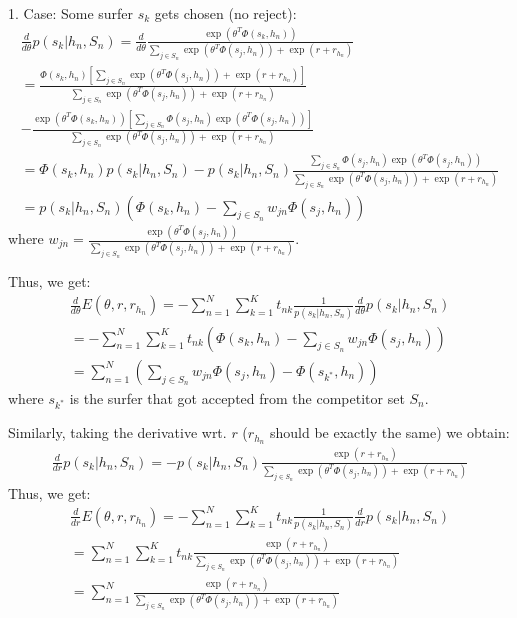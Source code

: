 1. Case: Some surfer $s_k$ gets chosen (no reject):
\begin{eqnarray}
\frac{d}{d \theta} p(s_k | h_n, S_n) = \frac{d}{d \theta} \frac{\exp(\theta^T \Phi(s_k,h_n))}{\sum_{j \in S_n} \exp(\theta^T \Phi(s_j,h_n)) + \exp(r + r_{h_n})} \\
= \frac{\Phi(s_k,h_n) [\sum_{j \in S_n} \exp(\theta^T \Phi(s_j,h_n)) + \exp(r + r_{h_n})]}{\sum_{j \in S_n} \exp(\theta^T \Phi(s_j,h_n)) + \exp(r + r_{h_n})} \\
- \frac{\exp(\theta^T \Phi(s_k,h_n)) [\sum_{j \in S_n} \Phi(s_j,h_n) \exp(\theta^T \Phi(s_j,h_n))]}{\sum_{j \in S_n} \exp(\theta^T \Phi(s_j,h_n)) + \exp(r + r_{h_n})}\\
= \Phi(s_k,h_n) p(s_k | h_n, S_n) - p(s_k | h_n, S_n) \frac{\sum_{j \in S_n} \Phi(s_j,h_n) \exp(\theta^T \Phi(s_j,h_n))}{\sum_{j \in S_n} \exp(\theta^T \Phi(s_j,h_n)) + \exp(r + r_{h_n})}\\
= p(s_k | h_n, S_n) (\Phi(s_k,h_n) - \sum_{j \in S_n} w_{jn} \Phi(s_j,h_n))
\end{eqnarray}
where $w_{jn}=\frac{\exp(\theta^T \Phi(s_j,h_n))}{\sum_{j \in S_n} \exp(\theta^T \Phi(s_j,h_n)) + \exp(r + r_{h_n})}$.

Thus, we get:
\begin{eqnarray}
\frac{d}{d \theta} E(\theta, r, r_{h_n}) = - \sum_{n=1}^N \sum_{k=1}^K t_{nk} \frac{1}{p(s_k | h_n, S_n)} \frac{d}{d \theta} p(s_k | h_n, S_n)\\
= - \sum_{n=1}^N \sum_{k=1}^K t_{nk} (\Phi(s_k,h_n) - \sum_{j \in S_n} w_{jn} \Phi(s_j,h_n)) \\
= \sum_{n=1}^N (\sum_{j \in S_n} w_{jn} \Phi(s_j,h_n) - \Phi(s_{k^*},h_n))
\end{eqnarray}
where $s_{k^*}$ is the surfer that got accepted from the competitor set $S_n$.

Similarly, taking the derivative wrt. $r$ ($r_{h_n}$ should be exactly the same) we obtain:
\begin{eqnarray}
\frac{d}{d r} p(s_k | h_n, S_n) = -  p(s_k | h_n, S_n)  \frac{\exp(r + r_{h_n})}{\sum_{j \in S_n} \exp(\theta^T \Phi(s_j,h_n)) + \exp(r + r_{h_n})}
\end{eqnarray}
Thus, we get:
\begin{eqnarray}
\frac{d}{d r} E(\theta, r, r_{h_n}) = - \sum_{n=1}^N \sum_{k=1}^K t_{nk} \frac{1}{p(s_k | h_n, S_n)} \frac{d}{d r} p(s_k | h_n, S_n)\\
= \sum_{n=1}^N \sum_{k=1}^K t_{nk} \frac{\exp(r + r_{h_n})}{\sum_{j \in S_n} \exp(\theta^T \Phi(s_j,h_n)) + \exp(r + r_{h_n})} \\
= \sum_{n=1}^N \frac{\exp(r + r_{h_n})}{\sum_{j \in S_n} \exp(\theta^T \Phi(s_j,h_n)) + \exp(r + r_{h_n})}
\end{eqnarray}




